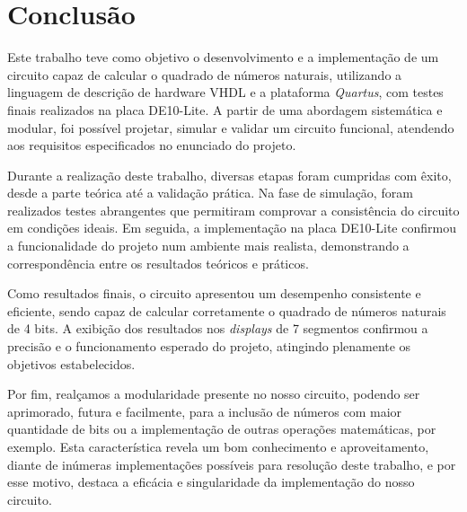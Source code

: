 \section{Conclusão}

Este trabalho teve como objetivo o desenvolvimento e a implementação de um circuito capaz de calcular o quadrado de números naturais, utilizando a linguagem de descrição de hardware VHDL e a plataforma \textit{Quartus}, com testes finais realizados na placa DE10-Lite. A partir de uma abordagem sistemática e modular, foi possível projetar, simular e validar um circuito funcional, atendendo aos requisitos especificados no enunciado do projeto.

Durante a realização deste trabalho, diversas etapas foram cumpridas com êxito, desde a parte teórica até a validação prática. Na fase de simulação, foram realizados testes abrangentes que permitiram comprovar a consistência do circuito em condições ideais. Em seguida, a implementação na placa DE10-Lite confirmou a funcionalidade do projeto num ambiente mais realista, demonstrando a correspondência entre os resultados teóricos e práticos.

Como resultados finais, o circuito apresentou um desempenho consistente e eficiente, sendo capaz de calcular corretamente o quadrado de números naturais de 4 bits. A exibição dos resultados nos \textit{displays} de 7 segmentos confirmou a precisão e o funcionamento esperado do projeto, atingindo plenamente os objetivos estabelecidos.

Por fim, realçamos a modularidade presente no nosso circuito, podendo ser aprimorado, futura e facilmente, para a inclusão de números com maior quantidade de bits ou a implementação de outras operações matemáticas, por exemplo. Esta característica revela um bom conhecimento e aproveitamento, diante de inúmeras implementações possíveis para resolução deste trabalho, e por esse motivo, destaca a eficácia e singularidade da implementação do nosso circuito.